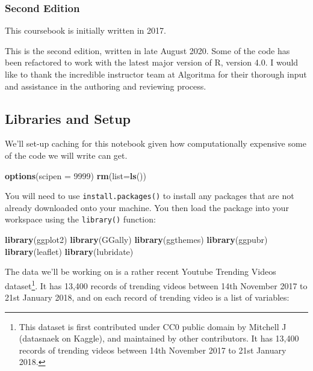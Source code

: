 \documentclass[]{article}
\newenvironment{Shaded}{\begin{snugshade}}{\end{snugshade}}
\newcommand{\DataTypeTok}[1]{\textcolor[rgb]{0.13,0.29,0.53}{#1}}
\newcommand{\DecValTok}[1]{\textcolor[rgb]{0.00,0.00,0.81}{#1}}
\newcommand{\KeywordTok}[1]{\textcolor[rgb]{0.13,0.29,0.53}{\textbf{#1}}}
\newcommand{\NormalTok}[1]{#1}
\begin{document}
\hypertarget{second-edition}{%
\subsubsection{Second Edition}\label{second-edition}}

This coursebook is initially written in 2017.

This is the second edition, written in late August 2020. Some of the
code has been refactored to work with the latest major version of R,
version 4.0. I would like to thank the incredible instructor team at
Algoritma for their thorough input and assistance in the authoring and
reviewing process.

\hypertarget{libraries-and-setup}{%
\subsection{Libraries and Setup}\label{libraries-and-setup}}

We'll set-up caching for this notebook given how computationally
expensive some of the code we will write can get.

\begin{Shaded}
\begin{Highlighting}[]
\KeywordTok{options}\NormalTok{(}\DataTypeTok{scipen =} \DecValTok{9999}\NormalTok{)}
\KeywordTok{rm}\NormalTok{(}\DataTypeTok{list=}\KeywordTok{ls}\NormalTok{())}
\end{Highlighting}
\end{Shaded}

You will need to use \texttt{install.packages()} to install any packages
that are not already downloaded onto your machine. You then load the
package into your workspace using the \texttt{library()} function:

\begin{Shaded}
\begin{Highlighting}[]
\KeywordTok{library}\NormalTok{(ggplot2)}
\KeywordTok{library}\NormalTok{(GGally)}
\KeywordTok{library}\NormalTok{(ggthemes)}
\KeywordTok{library}\NormalTok{(ggpubr)}
\KeywordTok{library}\NormalTok{(leaflet)}
\KeywordTok{library}\NormalTok{(lubridate)}
\end{Highlighting}
\end{Shaded}

The data we'll be working on is a rather recent Youtube Trending Videos
dataset\footnote{This dataset is first contributed under CC0 public
  domain by Mitchell J (datasnaek on Kaggle), and maintained by other
  contributors. It has 13,400 records of trending videos between 14th
  November 2017 to 21st January 2018.}. It has 13,400 records of
trending videos between 14th November 2017 to 21st January 2018, and on
each record of trending video is a list of variables:
\end{document}
